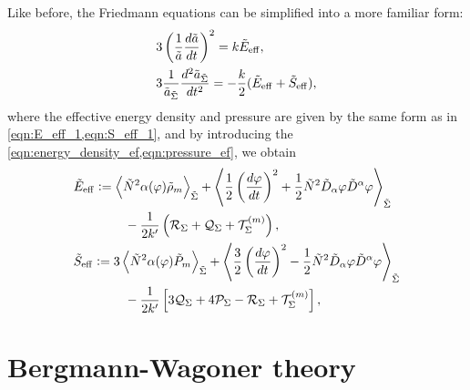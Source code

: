 Like before, the Friedmann equations can be simplified into a more familiar form:
\begin{align}
    &3\left(\frac{1}{\Tilde{a}}\frac{d\Tilde{a}}{dt}\right)^2 = k\tilde{E}_{\mathrm{eff}},\\
    &3\frac{1}{\Tilde{a}_{\Tilde{\Sigma}}}\frac{d^2\Tilde{a}_{\Tilde{\Sigma}}}{dt^2}=-\frac{k}{2}(\tilde{E}_{\mathrm{eff}}+\tilde{S}_{\mathrm{eff}}),
\end{align}
where the effective energy density and pressure are given by the same form as in \cref{eqn:E_eff_1,eqn:S_eff_1}, and by introducing the \cref{eqn:energy_density_ef,eqn:pressure_ef}, we obtain
\begin{align}
    &\tilde{E}_{\mathrm{eff}} := \left\langle \tilde{N}^2 \alpha(\varphi)\tilde{\rho}_m \right\rangle_{\Tilde{\Sigma}}+\left\langle \frac{1}{2}\left(\frac{d\varphi}{dt}\right)^2+\frac{1}{2}\tilde{N}^2\tilde{D}_\alpha\varphi \tilde{D}^\alpha\varphi\right\rangle_{\tilde{\Sigma}} \\
    &\qquad\qquad-\frac{1}{2k'}\left(\mathcal{R}_\Sigma+\mathcal{Q}_{\Sigma}+\mathcal{T}^{(m)}_{\Sigma}\right),\\
    &\tilde{S}_{\mathrm{eff}} := 3\left\langle \tilde{N}^2 \alpha(\varphi)\tilde{P}_m \right\rangle_{\Tilde{\Sigma}}+\left\langle \frac{3}{2}\left(\frac{d\varphi}{dt}\right)^2-\frac{1}{2}\tilde{N}^2\tilde{D}_\alpha\varphi \tilde{D}^\alpha\varphi\right\rangle_{\tilde{\Sigma}}\\
    &\qquad\qquad-\frac{1}{2k'}\left[3\mathcal{Q}_{\Sigma}+4\mathcal{P}_{\Sigma}-\mathcal{R}_\Sigma+\mathcal{T}^{(m)}_{\Sigma}\right],
\end{align}



\section{Bergmann-Wagoner theory}